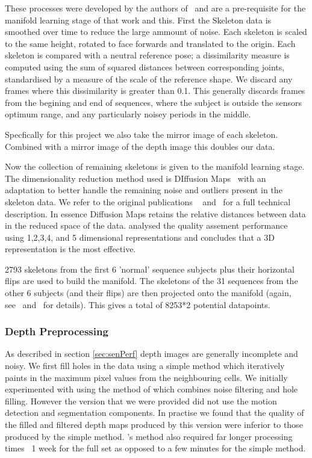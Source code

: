 \documentclass[11pt]{article} %
\begin{document}
These processes were developed by the authors of~\cite{Paiement} and are a pre-requisite for the manifold learning stage of that work and this. First the Skeleton data is smoothed over time to reduce the large ammount of noise. Each skeleton is scaled to the same height, rotated to face forwards and translated to the origin. Each skeleton is compared with a neutral reference pose;  a dissimilarity measure is computed  using the sum of squared distances between corresponding joints, standardised by a measure of the scale of the reference shape. We discard any frames where this dissimilarity is greater than 0.1. This generally discards frames from the begining and end of sequences, where the subject is outside the sensors optimum range, and any particularly noisey periods in the middle. 

Specfically for this project we also take the mirror image of each skeleton. Combined with a mirror image of the depth image this doubles our data. 

Now the collection of remaining skeletons is given to the manifold learning stage. The dimensionality reduction method used is DIffusion Maps~\cite{Coifman2006} with an adaptation to better handle the remaining noise and outliers present in the skeleton data. We refer to the original publications ~\cite{Paiement} and~\cite{Tao} for a full technical description. In essence Diffusion Maps retains the relative distances between data in the reduced space of the data. \cite{Tao} analysed the quality assement performance using 1,2,3,4, and 5 dimensional representations and concludes that a 3D representation is the most effective.

2793 skeletons from the first 6 'normal' sequence subjects plus their horizontal flips are used to build the manifold. The skeletons of the 31 sequences from the other 6 subjects (and their flips) are then projected onto the manifold (again, see~\cite{Paiement} and~\cite{Tao} for details). This gives a total of 8253*2 potential datapoints.


\subsubsection{Depth Preprocessing}

As described in section \ref{sec:senPerf} depth images are generally incomplete and noisy. We first fill holes in the data using a simple method which iteratively paints in the maximum pixel values from the neighbouring cells. We initially experimented with using the method of \cite{Camplani2012a} which combines noise filtering and hole filling. However the version that we were provided did not use the motion detection and segmentation components. In practise we found that the quality of the filled and filtered depth maps produced by this version were inferior to those produced by the simple method.  \cite{Camplani2012a}'s method also required far longer processing times ~1 week for the full set as opposed to a few minutes for the simple method. 
\end{document}
